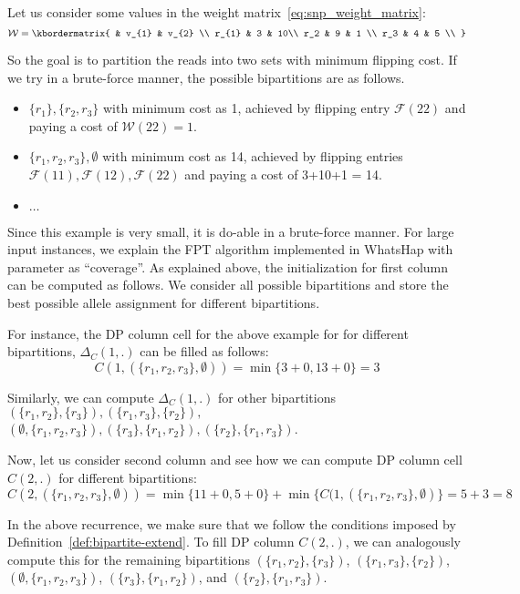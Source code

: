 Let us consider some values in the weight matrix~\eqref{eq:snp_weight_matrix}:
\begin{equation}\label{eq:snp_weight_matrix1}
  \mathcal{W}  = \kbordermatrix{
     & v_{1}       & v_{2}  \\
    r_{1}       & 3 &  10\\
    r_2 & 9 & 1 \\
    r_3 & 4 & 5 \\
  }
\end{equation}

So the goal is to partition the reads into two sets with minimum flipping cost. If we try in a brute-force manner, the possible bipartitions are as follows.

\begin{itemize}
 \item $\{r_1\}, \{r_2, r_3\}$ with minimum cost as 1, achieved by flipping entry $\mathcal{F}(22)$ and paying a cost of $\mathcal{W}(22) = 1$.
 \item $\{r_1, r_2, r_3\}, \emptyset$ with minimum cost as 14, achieved by flipping entries $\mathcal{F}(11), \mathcal{F}(12), \mathcal{F}(22)$ and paying a cost of 3+10+1 = 14.
  \item $\ldots$
\end{itemize}

Since this example is very small, it is do-able in a brute-force manner. For large input instances, we explain the FPT algorithm implemented in WhatsHap with parameter as ``coverage''.
As explained above, the initialization for first column can be computed as follows. We consider all possible bipartitions and store the best possible allele assignment for different bipartitions.

For instance, the DP column cell for the above example for for different bipartitions, $\Delta_C(1,.)$ can be filled as follows:
\[C(1, (\{r_1,r_2,r_3\},\emptyset)) =\min\{3+0,13+0\} = 3\]

Similarly, we can compute $\Delta_C(1,.)$ for other bipartitions $(\{r_1,r_2\},\{r_3\}),(\{r_1,r_3\},\{r_2\}),$\\
$(\emptyset,\{r_1,r_2,r_3\}), (\{r_3\},\{r_1,r_2\}), (\{r_2\},\{r_1,r_3\})$.

Now, let us consider second column and see how we can compute DP column cell $C(2,.)$ for different bipartitions:
\[C(2, (\{r_1,r_2,r_3\},\emptyset)) = \min\{11+0, 5+0\}  + \min\{C(1, (\{r_1,r_2,r_3\},\emptyset)\} = 5+3 = 8 \]

In the above recurrence, we make sure that we follow the conditions imposed by Definition~\ref{def:bipartite-extend}.
To fill DP column $C(2,.)$, we can analogously compute this for the remaining bipartitions $(\{r_1,r_2\},\{r_3\})$,
$(\{r_1,r_3\},\{r_2\})$, $(\emptyset,\{r_1,r_2,r_3\})$, $(\{r_3\},\{r_1,r_2\})$, and $(\{r_2\},\{r_1,r_3\})$.

